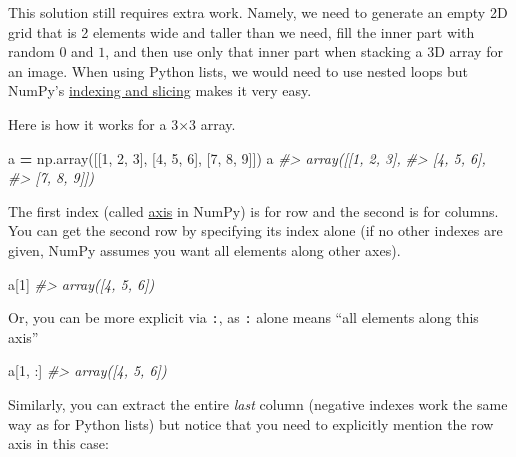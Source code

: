 \documentclass[
]{book}
\newenvironment{Shaded}{\begin{snugshade}}{\end{snugshade}}
\newcommand{\CommentTok}[1]{\textcolor[rgb]{0.56,0.35,0.01}{\textit{#1}}}
\newcommand{\DecValTok}[1]{\textcolor[rgb]{0.00,0.00,0.81}{#1}}
\newcommand{\NormalTok}[1]{#1}
\newcommand{\OperatorTok}[1]{\textcolor[rgb]{0.81,0.36,0.00}{\textbf{#1}}}
\begin{document}
This solution still requires extra work. Namely, we need to generate an empty 2D grid that is 2 elements wide and taller than we need, fill the inner part with random \(0\) and \(1\), and then use only that inner part when stacking a 3D array for an image. When using Python lists, we would need to use nested loops but NumPy's \href{https://numpy.org/doc/stable/user/absolute_beginners.html\#indexing-and-slicing}{indexing and slicing} makes it very easy.

Here is how it works for a 3×3 array.

\begin{Shaded}
\begin{Highlighting}[]
\NormalTok{a }\OperatorTok{=}\NormalTok{ np.array([[}\DecValTok{1}\NormalTok{, }\DecValTok{2}\NormalTok{, }\DecValTok{3}\NormalTok{], [}\DecValTok{4}\NormalTok{, }\DecValTok{5}\NormalTok{, }\DecValTok{6}\NormalTok{], [}\DecValTok{7}\NormalTok{, }\DecValTok{8}\NormalTok{, }\DecValTok{9}\NormalTok{]])}
\NormalTok{a}
\CommentTok{\#\textgreater{} array([[1, 2, 3],}
\CommentTok{\#\textgreater{}        [4, 5, 6],}
\CommentTok{\#\textgreater{}        [7, 8, 9]])}
\end{Highlighting}
\end{Shaded}

The first index (called \href{https://numpy.org/doc/stable/glossary.html\#term-axis}{axis} in NumPy) is for row and the second is for columns. You can get the second row by specifying its index alone (if no other indexes are given, NumPy assumes you want all elements along other axes).

\begin{Shaded}
\begin{Highlighting}[]
\NormalTok{a[}\DecValTok{1}\NormalTok{]}
\CommentTok{\#\textgreater{} array([4, 5, 6])}
\end{Highlighting}
\end{Shaded}

Or, you can be more explicit via \texttt{:}, as \texttt{:} alone means ``all elements along this axis''

\begin{Shaded}
\begin{Highlighting}[]
\NormalTok{a[}\DecValTok{1}\NormalTok{, :]}
\CommentTok{\#\textgreater{} array([4, 5, 6])}
\end{Highlighting}
\end{Shaded}

Similarly, you can extract the entire \emph{last} column (negative indexes work the same way as for Python lists) but notice that you need to explicitly mention the row axis in this case:
\end{document}
